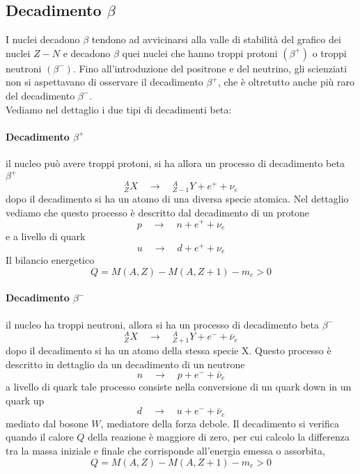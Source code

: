 \subsection{Decadimento $\beta$}
I nuclei decadono $\beta$ tendono ad avvicinarsi alla valle di stabilità del grafico dei nuclei $Z-N$ e decadono $\beta$ quei nuclei che hanno troppi protoni $(\beta^+)$ o troppi neutroni $(\beta^-)$.
Fino all'introduzione del positrone e del neutrino, gli scienziati non si aspettavano di osservare il decadimento $\beta^+$, che è oltretutto anche più raro del decadimento $\beta^-$. \\
Vediamo nel dettaglio i due tipi di decadimenti beta:
\paragraph{Decadimento $\beta^+$} il nucleo può avere troppi protoni, si ha allora un processo di decadimento beta $\beta^+$
\begin{equation}
^{A}_{Z}X \quad\longrightarrow\quad ^{A}_{Z-1}Y + e^+ + \nu_e
\end{equation}
dopo il decadimento si ha un atomo di una diversa specie atomica.
Nel dettaglio vediamo che questo processo è descritto dal decadimento di un protone
\begin{equation}
p \quad\longrightarrow\quad n + e^+ + \nu_e
\end{equation}
e a livello di quark 
\begin{equation}
u \quad\longrightarrow\quad d + e^+ + \nu_e
\end{equation}
Il bilancio energetico 
\begin{equation}
Q = M(A,Z) - M(A,Z+1) - m_e > 0
\end{equation}

\paragraph{Decadimento $\beta^-$}  il nucleo ha troppi neutroni, allora si ha un processo di decadimento beta $\beta^-$
\begin{equation}
^{A}_{Z}X \quad\longrightarrow\quad  ^{A}_{Z+1}Y + e^- + \bar\nu_e
\end{equation}
dopo il decadimento si ha un atomo della stessa specie X.
Questo processo è descritto in dettaglio da un decadimento di un neutrone
\begin{equation}
n \quad\longrightarrow\quad p + e^- + \bar\nu_e
\end{equation}
a livello di quark tale processo consiste nella conversione di un quark down in un quark up
\begin{equation}
d \quad\longrightarrow\quad u + e^- + \bar\nu_e
\end{equation}
mediato dal bosone $W$, mediatore della forza debole.
Il decadimento si verifica quando il calore $Q$ della reazione è maggiore di zero, per cui calcolo la differenza tra la massa iniziale e finale che corrisponde all'energia emessa o assorbita,
\begin{equation}
Q = M(A,Z) - M(A,Z+1) - m_e > 0
\end{equation}

